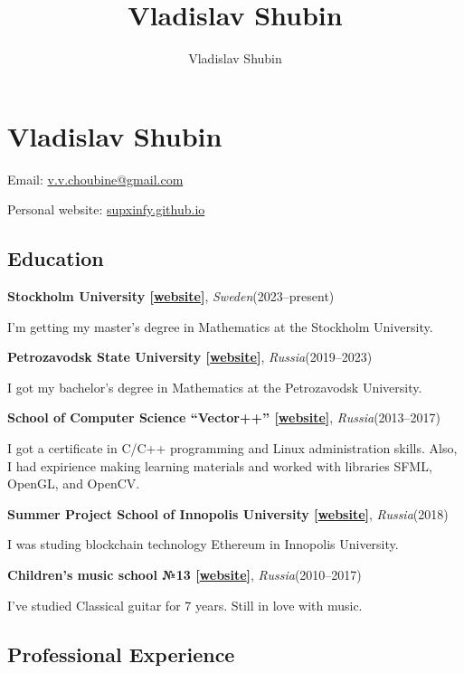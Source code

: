 \documentclass[11pt]{article}
\author{Vladislav Shubin}
\title{Vladislav Shubin}
\begin{document}
\section*{Vladislav Shubin}

\begin{center}
	Email: \href{mailto:v.v.choubine@gmail.com}{v.v.choubine@gmail.com}
	
	Personal website: \href{https://supxinfy.github.io}{supxinfy.github.io}
\end{center}

\subsection*{Education}

\textbf{Stockholm University [\href{https://www.su.se}{website}]}, \textit{Sweden}\hfill(2023--present)

I'm getting my master's degree in Mathematics at the Stockholm University.

\vspace{2mm}
\noindent\textbf{Petrozavodsk State University [\href{https://petrsu.ru}{website}]}, \textit{Russia}\hfill(2019--2023)


I got my bachelor's degree in Mathematics at the Petrozavodsk University.

\vspace{2mm}
\noindent\textbf{School of Computer Science ``Vector++'' [\href{https://www.vector-plus-plus.ru}{website}]}, \textit{Russia}\hfill(2013--2017)

I got a certificate in C/C++ programming and Linux administration skills. Also, I had expirience making learning materials and worked with libraries SFML, OpenGL, and OpenCV.

\vspace{2mm}
\noindent\textbf{Summer Project School of Innopolis University [\href{https://team-project.university.innopolis.ru/projectschool2018}{website}]}, \textit{Russia}\hfill(2018) 

I was studing blockchain technology Ethereum in Innopolis University.  

\vspace{2mm}
\noindent\textbf{Children's music school №13 [\href{http://dmsh13.org.ru}{website}]}, \textit{Russia}\hfill(2010--2017)

I've studied Classical guitar for 7 years. Still in love with music.

\subsection*{Professional Experience}
\end{document}
